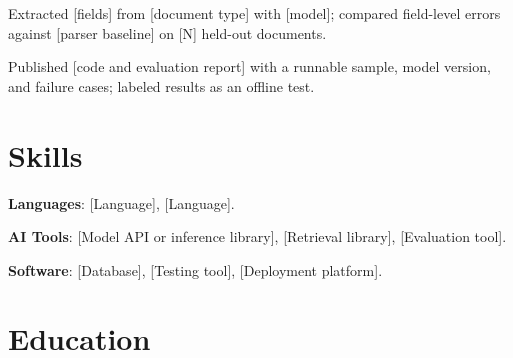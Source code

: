\documentclass{resume}
\begin{document}
\begin{jobduties}
  \item Extracted [fields] from [document type] with [model]; compared field-level errors against [parser baseline] on [N] held-out documents.
  \item Published [code and evaluation report] with a runnable sample, model version, and failure cases; labeled results as an offline test.
\end{jobduties}

\section{Skills}
\begin{skillitems}
  \item \textbf{Languages}: [Language], [Language].
  \item \textbf{AI Tools}: [Model API or inference library], [Retrieval library], [Evaluation tool].
  \item \textbf{Software}: [Database], [Testing tool], [Deployment platform].
\end{skillitems}

\section{Education}
\end{document}
